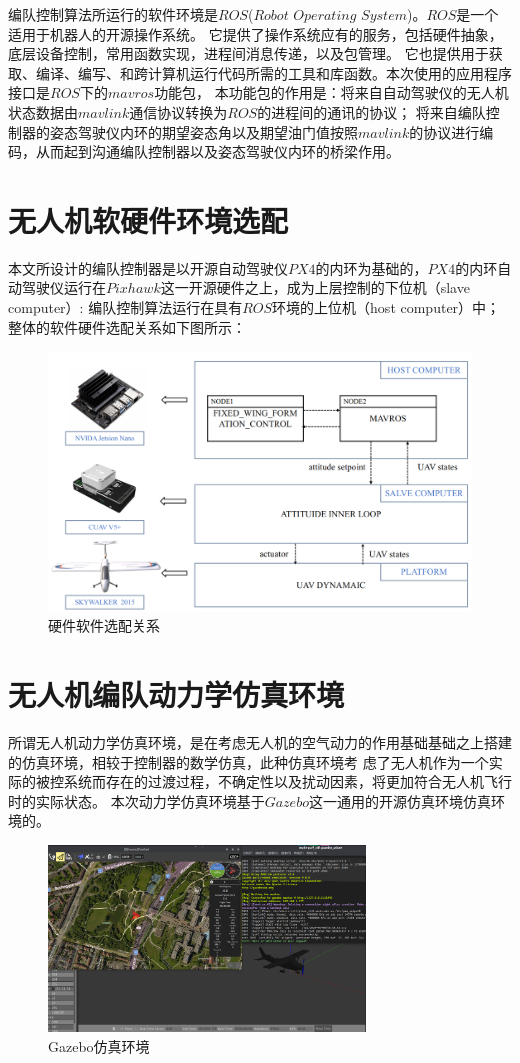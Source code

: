 编队控制算法所运行的软件环境是$ROS$($Robot$ $Operating$ $System$)。$ROS$是一个适用于机器人的开源操作系统。
它提供了操作系统应有的服务，包括硬件抽象，底层设备控制，常用函数实现，进程间消息传递，以及包管理。
它也提供用于获取、编译、编写、和跨计算机运行代码所需的工具和库函数。本次使用的应用程序接口是$ROS$下的$mavros$功能包，
本功能包的作用是：将来自自动驾驶仪的无人机状态数据由$mavlink$通信协议转换为$ROS$的进程间的通讯的协议；
将来自编队控制器的姿态驾驶仪内环的期望姿态角以及期望油门值按照$mavlink$的协议进行编码，从而起到沟通编队控制器以及姿态驾驶仪内环的桥梁作用。
\section{无人机软硬件环境选配}
本文所设计的编队控制器是以开源自动驾驶仪$PX4$的内环为基础的，$PX4$的内环自动驾驶仪运行在$Pixhawk$这一开源硬件之上，成为上层控制的下位机（slave computer）:
编队控制算法运行在具有$ROS$环境的上位机（host computer）中；
整体的软件硬件选配关系如下图所示：
\begin{figure}[H]
    \centering
    \includegraphics[width=1\textwidth]{figures/c4/c4-soft-hard.png}
    \caption{硬件软件选配关系}\label{fig:c4-soft-hard.png}
\end{figure}
\section{无人机编队动力学仿真环境}
所谓无人机动力学仿真环境，是在考虑无人机的空气动力的作用基础基础之上搭建的仿真环境，相较于控制器的数学仿真，此种仿真环境考
虑了无人机作为一个实际的被控系统而存在的过渡过程，不确定性以及扰动因素，将更加符合无人机飞行时的实际状态。
本次动力学仿真环境基于$Gazebo$这一通用的开源仿真环境仿真环境的。
\begin{figure}[H]
    \centering
    \includegraphics[width=0.75\textwidth]{figures/c4/Gazebo.png}
    \caption{Gazebo仿真环境}\label{fig:c4-Gazebo}
\end{figure}

